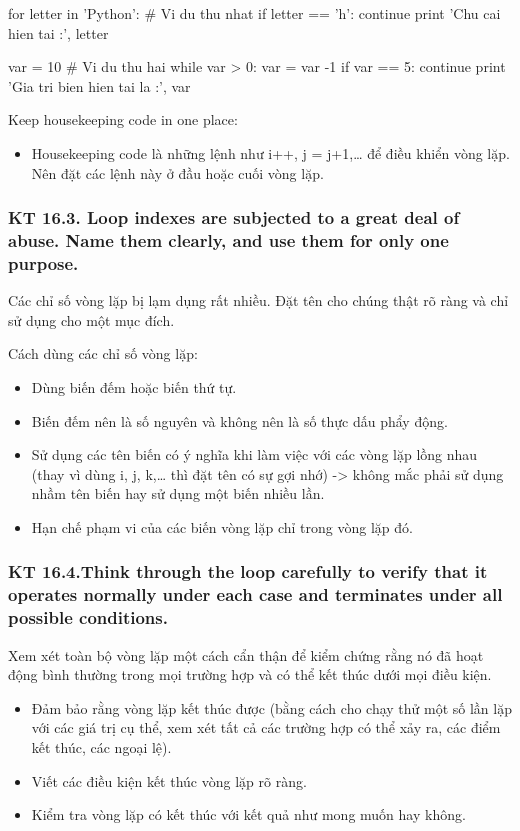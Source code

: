\documentclass[12pt]{report}
\begin{document}
\begin{python}
for letter in 'Python':     # Vi du thu nhat
   if letter == 'h':
      continue
   print 'Chu cai hien tai :', letter

var = 10                    # Vi du thu hai
while var > 0:              
   var = var -1
   if var == 5:
      continue
   print 'Gia tri bien hien tai la :', var
\end{python}
\noindent Keep housekeeping code in one place:
\begin{itemize}
	\item Housekeeping code là những lệnh như i++, j = j+1,… để điều khiển vòng lặp. Nên đặt các lệnh này ở đầu hoặc cuối vòng lặp.
\end{itemize}

\subsubsection{KT 16.3. Loop indexes are subjected to a great deal of abuse. Name them clearly, and use them for only one purpose.}
Các chỉ số vòng lặp bị lạm dụng rất nhiều. Đặt tên cho chúng thật rõ ràng và chỉ sử dụng cho một mục đích.
\vspace*{3mm}

\noindent Cách dùng các chỉ số vòng lặp:
\begin{itemize}
	\item Dùng biến đếm hoặc biến thứ tự.
	\item Biến đếm nên là số nguyên và không nên là số thực dấu phẩy động.
	\item Sử dụng các tên biến có ý nghĩa khi làm việc với các vòng lặp lồng nhau (thay vì dùng i, j, k,… thì đặt tên có sự gợi nhớ) -> không mắc phải sử dụng nhầm tên biến hay sử dụng một biến nhiều lần.
	\item Hạn chế phạm vi của các biến vòng lặp chỉ trong vòng lặp đó.
\end{itemize}

\subsubsection{KT 16.4.Think through the loop carefully to verify that it operates normally under each case and terminates under all possible conditions.}
Xem xét toàn bộ vòng lặp một cách cẩn thận để kiểm chứng rằng nó đã hoạt động bình thường trong mọi trường hợp và có thể kết thúc dưới mọi điều kiện.
\begin{itemize}
	\item Đảm bảo rằng vòng lặp kết thúc được (bằng cách cho chạy thử một số lần lặp với các giá trị cụ thể, xem xét tất cả các trường hợp có thể xảy ra, các điểm kết thúc, các ngoại lệ).
	\item Viết các điều kiện kết thúc vòng lặp rõ ràng.
	\item Kiểm tra vòng lặp có kết thúc với kết quả như mong muốn hay không.
\end{itemize}
\end{document}

